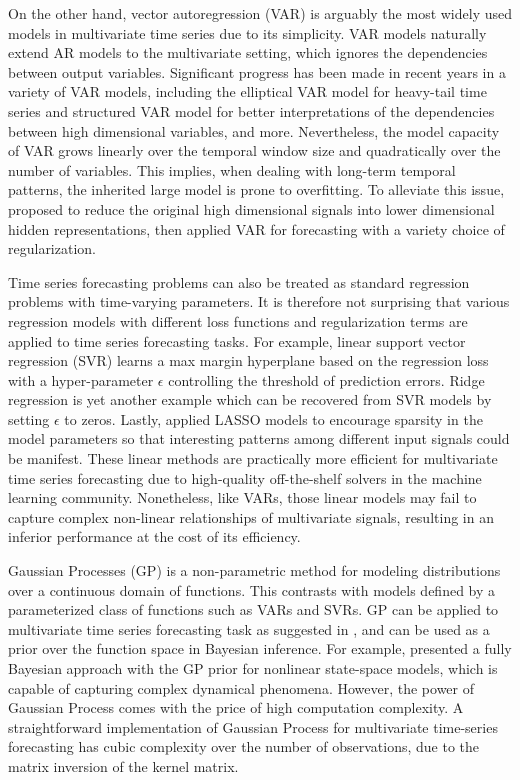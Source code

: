 On the other hand, vector autoregression (VAR) is arguably the most widely used models in multivariate time series
\cite{hamilton1994time,box2015time,lutkepohl2005new} due to its simplicity. VAR models naturally extend AR models to the multivariate setting, which ignores the dependencies between output variables. Significant progress has been made in recent years in a variety of VAR models, including the elliptical VAR model \cite{qiu2015robust} for heavy-tail time series and structured VAR model \cite{melnyk2016estimating} for better interpretations of the dependencies between high dimensional variables, and more. Nevertheless, the model capacity of VAR grows linearly over the temporal window size and quadratically over the number of variables. This implies, when dealing with long-term temporal patterns, the inherited large model is prone to overfitting. To alleviate this issue, \cite{Yu_NIPS_16} proposed to reduce the original high dimensional signals into lower dimensional hidden representations, then applied VAR for forecasting with a variety choice of regularization.

Time series forecasting problems can also be treated as standard regression problems with time-varying parameters. It is therefore not surprising that various regression models with different loss functions and regularization terms are applied to time series forecasting tasks. For example, linear support vector regression (SVR) \cite{kim2003financial,cao2003support} learns a max margin hyperplane based on the regression loss with a hyper-parameter $\epsilon$ controlling the threshold of prediction errors. Ridge regression is yet another example which can be recovered from SVR models by setting $\epsilon$ to zeros. Lastly, \cite{li2014forecasting} applied LASSO models to encourage sparsity in the model parameters so that interesting patterns among different input signals could be manifest. These linear methods are practically more efficient for multivariate time series forecasting due to high-quality off-the-shelf solvers in the machine learning community. Nonetheless, like VARs, those linear models may fail to capture complex non-linear relationships of multivariate signals, resulting in an inferior performance at the cost of its efficiency.

Gaussian Processes (GP) is a non-parametric method for modeling distributions over a continuous domain of functions. This contrasts with models defined by a parameterized class of functions such as VARs and SVRs. GP can be applied to multivariate time series forecasting task as suggested in \cite{roberts2013gaussian}, and can be used as a prior over the function space in Bayesian inference. For example, \cite{frigola2013bayesian} presented a fully Bayesian approach with the GP prior for nonlinear state-space models, which is capable of capturing complex dynamical phenomena. However, the power of Gaussian Process comes with the price of high computation complexity. A straightforward implementation of Gaussian Process for multivariate time-series forecasting has cubic complexity over the number of observations, due to the matrix inversion of the kernel matrix.

